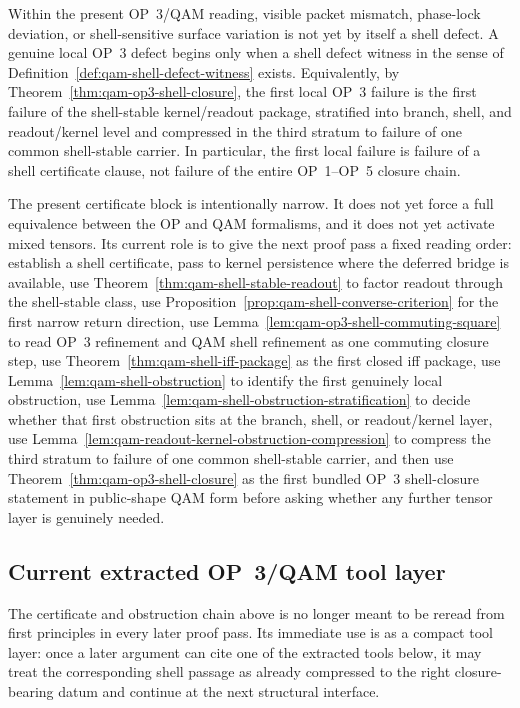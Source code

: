 \begin{corollary}\label{cor:qam-shell-defect-localization}
Within the present OP~3/QAM reading, visible packet mismatch, phase-lock deviation, or shell-sensitive surface variation is not yet by itself a shell defect. A genuine local OP~3 defect begins only when a shell defect witness in the sense of Definition~\ref{def:qam-shell-defect-witness} exists. Equivalently, by Theorem~\ref{thm:qam-op3-shell-closure}, the first local OP~3 failure is the first failure of the shell-stable kernel/readout package, stratified into branch, shell, and readout/kernel level and compressed in the third stratum to failure of one common shell-stable carrier. In particular, the first local failure is failure of a shell certificate clause, not failure of the entire OP~1--OP~5 closure chain.
\end{corollary}

\begin{remark}
The present certificate block is intentionally narrow. It does not yet force a full equivalence between the OP and QAM formalisms, and it does not yet activate mixed tensors. Its current role is to give the next proof pass a fixed reading order: establish a shell certificate, pass to kernel persistence where the deferred bridge is available, use Theorem~\ref{thm:qam-shell-stable-readout} to factor readout through the shell-stable class, use Proposition~\ref{prop:qam-shell-converse-criterion} for the first narrow return direction, use Lemma~\ref{lem:qam-op3-shell-commuting-square} to read OP~3 refinement and QAM shell refinement as one commuting closure step, use Theorem~\ref{thm:qam-shell-iff-package} as the first closed iff package, use Lemma~\ref{lem:qam-shell-obstruction} to identify the first genuinely local obstruction, use Lemma~\ref{lem:qam-shell-obstruction-stratification} to decide whether that first obstruction sits at the branch, shell, or readout/kernel layer, use Lemma~\ref{lem:qam-readout-kernel-obstruction-compression} to compress the third stratum to failure of one common shell-stable carrier, and then use Theorem~\ref{thm:qam-op3-shell-closure} as the first bundled OP~3 shell-closure statement in public-shape QAM form before asking whether any further tensor layer is genuinely needed.
\end{remark}


\subsection*{Current extracted OP~3/QAM tool layer}
\begin{remark}\label{rem:qam-op3-tool-purpose}
The certificate and obstruction chain above is no longer meant to be reread from first principles in every later proof pass. Its immediate use is as a compact tool layer: once a later argument can cite one of the extracted tools below, it may treat the corresponding shell passage as already compressed to the right closure-bearing datum and continue at the next structural interface.
\end{remark}

